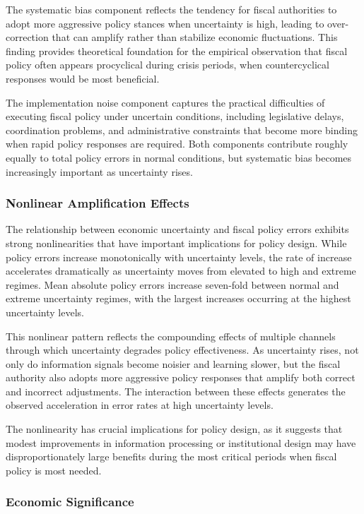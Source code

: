 \documentclass[5p,authoryear]{elsarticle}
\begin{document}
The systematic bias component reflects the tendency for fiscal authorities to adopt more aggressive policy stances when uncertainty is high, leading to over-correction that can amplify rather than stabilize economic fluctuations. This finding provides theoretical foundation for the empirical observation that fiscal policy often appears procyclical during crisis periods, when countercyclical responses would be most beneficial.

The implementation noise component captures the practical difficulties of executing fiscal policy under uncertain conditions, including legislative delays, coordination problems, and administrative constraints that become more binding when rapid policy responses are required. Both components contribute roughly equally to total policy errors in normal conditions, but systematic bias becomes increasingly important as uncertainty rises.

\subsubsection{Nonlinear Amplification Effects}

The relationship between economic uncertainty and fiscal policy errors exhibits strong nonlinearities that have important implications for policy design. While policy errors increase monotonically with uncertainty levels, the rate of increase accelerates dramatically as uncertainty moves from elevated to high and extreme regimes. Mean absolute policy errors increase seven-fold between normal and extreme uncertainty regimes, with the largest increases occurring at the highest uncertainty levels.

This nonlinear pattern reflects the compounding effects of multiple channels through which uncertainty degrades policy effectiveness. As uncertainty rises, not only do information signals become noisier and learning slower, but the fiscal authority also adopts more aggressive policy responses that amplify both correct and incorrect adjustments. The interaction between these effects generates the observed acceleration in error rates at high uncertainty levels.

The nonlinearity has crucial implications for policy design, as it suggests that modest improvements in information processing or institutional design may have disproportionately large benefits during the most critical periods when fiscal policy is most needed.

\subsubsection{Economic Significance}
\end{document}
